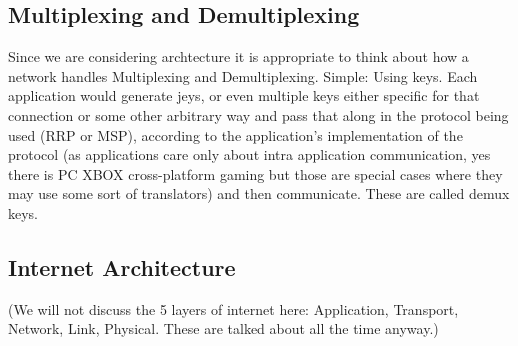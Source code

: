 \documentclass[12pt]{book}
\begin{document}
\subsection{Multiplexing and Demultiplexing}
Since we are considering archtecture it is appropriate to think about how a network handles Multiplexing and Demultiplexing. Simple: Using keys. Each application would generate jeys, or even multiple keys either specific for that connection or some other arbitrary way and pass that along in the protocol being used (RRP or MSP), according to the application's implementation of the protocol (as applications care only about intra application communication, yes there is PC XBOX cross-platform gaming but those are special cases where they may use some sort of translators) and then communicate. These are called demux keys.

\subsection{Internet Architecture}

(We will not discuss the 5 layers of internet here:
Application, Transport, Network, Link, Physical. These are talked about all the time anyway.)
\end{document}
